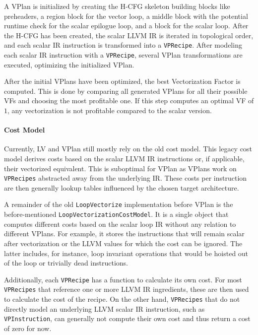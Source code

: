 \documentclass[sigplan,11pt,nonacm]{acmart}
\begin{document}
A VPlan is initialized by creating the H-CFG skeleton building blocks like preheaders, a 
region block for the vector loop, a middle block with the potential runtime check for the scalar 
epilogue loop, and a block for the scalar loop. After the H-CFG has been created, the scalar LLVM IR 
is iterated in topological order, and each scalar IR instruction is transformed into a \texttt{VPRecipe}.
After modeling each scalar IR instruction with a \texttt{VPRecipe}, several VPlan transformations 
are executed, optimizing the initialized VPlan.

After the initial VPlans have been optimized, the best Vectorization Factor is computed. This is done 
by comparing all generated VPlans for all their possible VFs and choosing the most profitable one. If 
this step computes an optimal VF of $1$, any vectorization is not profitable compared to the 
scalar version.

\paragraph{Cost Model}
Currently, LV and VPlan still mostly rely on the old cost model. This legacy cost model derives costs 
based on the scalar LLVM IR instructions or, if applicable, their vectorized equivalent.
This is suboptimal for VPlan as VPlans work on \texttt{VPRecipes} abstracted away from the underlying 
IR. These costs per instruction are then generally lookup tables influenced by the chosen target 
architecture.

A remainder of the old \texttt{LoopVectorize} implementation before VPlan is the 
before-mentioned \texttt{LoopVectorizationCostModel}. It is a single object that computes different costs based on the scalar loop 
IR without any relation to different VPlans. For example, it stores the instructions that will remain scalar 
after vectorization or the LLVM values for which the cost can 
be ignored. The latter includes, for instance, loop invariant operations that would be hoisted out of the loop 
or trivially dead instructions.

Additionally, each \texttt{VPRecipe} has a function to calculate its own cost. For most \texttt{VPRecipes} 
that reference one or more LLVM IR ingredients, these are then used to calculate the cost of the recipe.
On the other hand, \texttt{VPRecipes} that do not directly model an underlying LLVM scalar IR instruction, 
such as \texttt{VPInstruction}, can generally not compute their own cost and thus return a cost of zero 
for now.
\end{document}

